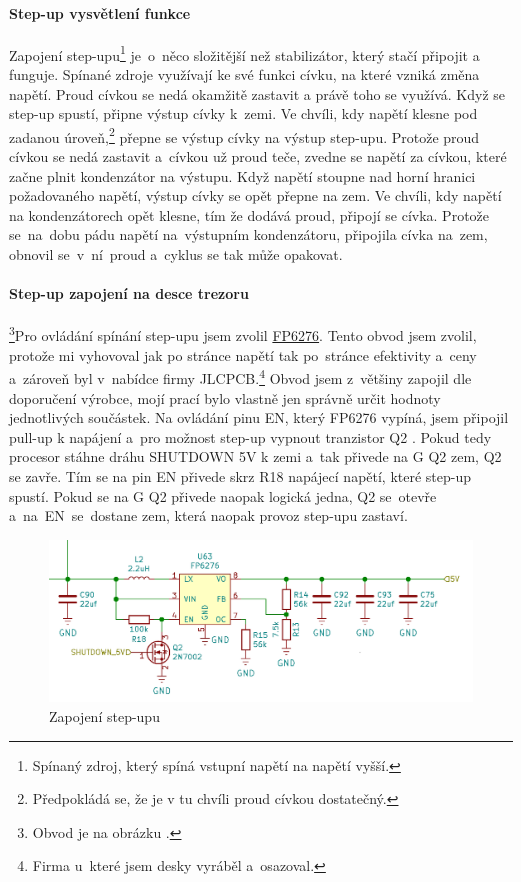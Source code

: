 \paragraph*{Step-up vysvětlení funkce}
Zapojení step-upu\footnote{Spínaný zdroj, který spíná vstupní napětí na napětí vyšší.} je~o~něco složitější než stabilizátor, který stačí připojit a funguje. 
Spínané zdroje využívají ke své funkci cívku, na které vzniká změna napětí. Proud cívkou se nedá okamžitě zastavit a právě toho se využívá. 
Když se step-up spustí, připne výstup cívky k~zemi. Ve chvíli, kdy napětí klesne pod zadanou úroveň,\footnote{Předpokládá se, že je v tu chvíli proud cívkou dostatečný.} 
přepne se výstup cívky na výstup step-upu.
Protože proud cívkou se nedá zastavit a~cívkou už proud teče, zvedne se napětí za cívkou, které začne plnit kondenzátor na výstupu.
Když napětí stoupne nad horní hranici požadovaného napětí, výstup cívky se opět přepne na zem. Ve chvíli, kdy napětí na kondenzátorech opět 
klesne, tím že dodává proud, připojí se cívka. Protože se~na~dobu pádu napětí na~výstupním kondenzátoru, připojila cívka na~zem, obnovil 
se~v~ní~proud a~cyklus se tak může opakovat.

\paragraph*{Step-up zapojení na desce trezoru}\footnote{Obvod je na obrázku .}Pro ovládání spínání step-upu jsem zvolil \href{https://datasheet.lcsc.com/szlcsc/Feeling-Tech-FP6276AXR-G1_C83308.pdf}{FP6276}.
Tento obvod jsem zvolil, protože mi vyhovoval jak po stránce napětí tak po~stránce efektivity a~ceny a~zároveň byl v~nabídce firmy JLCPCB.\footnote{Firma u~které jsem desky vyráběl a~osazoval.}
Obvod jsem z~většiny zapojil dle doporučení výrobce, mojí prací bylo vlastně jen správně určit hodnoty 
jednotlivých součástek. Na ovládání pinu EN, který FP6276 vypíná, jsem připojil pull-up k napájení a~pro možnost step-up vypnout tranzistor Q2 \parencite{cj3134k}. 
Pokud tedy procesor stáhne dráhu SHUTDOWN 5V k zemi a~tak přivede na G Q2 zem, 
Q2 se zavře. Tím se na pin EN přivede skrz R18 napájecí napětí, které step-up spustí. 
Pokud se na G Q2 přivede naopak logická jedna, Q2 se~otevře a~na~EN~se~dostane zem, která naopak provoz step-upu zastaví.

\begin{figure}[htbp]
    \centering
    \includegraphics[width=400pt]{kapitoly/obrazky/E4/napajeni/step-up.png}
    \caption{Zapojení step-upu}
    \label{fig:E4-step-up}
\end{figure}

